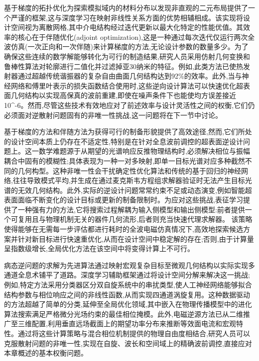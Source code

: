 基于梯度的拓扑优化为探索模拟域内的材料分布以发现非直观的二元布局提供了一个严谨的框架,这与深度学习在映射非线性关系方面的优势相辅相成。该实现将设计空间视为离散网格,其中介电结构经过迭代更新以最大化特定的性能优值。其效率的核心在于伴随优化(adjoint optimization),这是一种通过每次迭代仅运行两次全波仿真(一次正向和一次伴随)来计算梯度的方法,无论设计参数的数量多少。为了确保这些连续的数学解能够转化为可行的制造结果,研究人员采用仿射几何变换和鲁棒性算法对轮廓进行二值化并过滤掉亚30纳米的特征。例如,此类方法已使热发射器通过超越传统谐振器的复杂自由曲面几何结构达到92\%的效率。此外,当与神经网络和傅里叶表示的损失函数结合使用时,这些逆向设计算法可以快速优化超表面几何结构以实现高保真的波前重建,即使在噪声条件下也能使均方误差接近10\^{}-6。然而,尽管这些技术有效地应对了前述效率与设计灵活性之间的权衡,它们仍必须面对逆散射问题固有的非唯一性挑战,这一问题将在下一节中讨论。\citep{doi_10_1002_adom_202500249_9967e710} \citep{doi_10_48550_arxiv_2603_15210_fdcfb92f} \citep{doi_10_1515_nanoph_2020_0579_8812c5b1}

基于梯度的方法和伴随方法为获得可行的制备形貌提供了高效途径,然而,它们所处的设计空间本质上仍存在不适定性,特别是在针对全息波前调控的超表面逆设计问题上。这一数学难题源于从期望的光谱响应反推物理结构时,必须解决相位与振幅耦合中固有的模糊性;具体表现为一种一对多映射,即单一目标光谱对应多种截然不同的几何构型。这种非唯一性会干扰确定性优化算法和传统的基于回归的神经网络,往往导致模式平均,并生成在通过麦克斯韦方程组求解器验证时无法产生目标光谱的无效几何结构。此外,实际的逆设计问题常常约束不足或动态演变,例如智能超表面面临不断变化的设计目标或更新的制备限制时。为应对这些挑战,表征学习提供了一种强有力的方法,它将搜索过程解耦为输入侧模型和输出侧模型:前者提供一个可复用且与物理机制无关的器件几何流形,后者则充当快速代理求解器。\citep{doi_10_2139_ssrn_4082312_28ca582d} 该策略使得能够在无需每一步评估都进行耗时的全波电磁仿真情况下,高效地探索候选方案并针对新目标进行快速重优化,从而在设计空间中稳定解的存在;否则,由于计算量呈指数级增长,全局优化方法在该空间中将变得计算上不可行。\citep{doi_10_71465_fapm546_bda368a5} \citep{doi_10_1002_adom_202502062_d73a85e1}

病态逆问题的求解为先进算法通过映射宏观复杂目标至微观几何结构以实际实现多通道全息术铺平了道路。深度学习辅助框架通过将设计空间分解来解决这一挑战;例如,特定方法采用分类器区分双自旋系统中的串扰类型,使人工神经网络能够拟合结构参数与相位响应之间的非线性函数,从而实现四通道涡旋复用。这种数据驱动的方法超越了简单的分类,延伸至全局优化领域,其中嵌入在物理传播模型中的进化算法搜索满足严格微分光场约束的最佳相位掩模。此外,电磁逆源方法已从二维推广至三维配置,利用垂直远场截面上的期望功率分布来推断等效面电流和宏观特性。通过将这些计算策略与混合相位机制提供的物理自由度相结合,研究人员可以克服散射问题的非唯一性,实现在自旋、波长和空间域上的精确波前调控,直接应对本章概述的基本权衡问题。\citep{doi_10_1117_1_apn_2_1_016010_57069347} \citep{doi_10_1117_12_3110717_26d5b63b} \citep{doi_10_1109_lawp_2023_3266337_3b44a88a}

